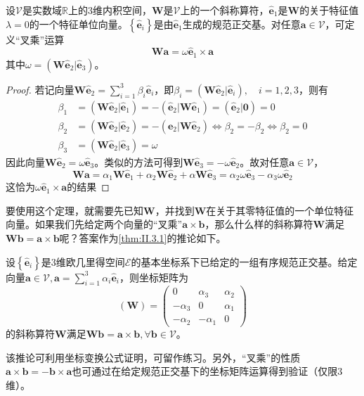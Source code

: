 \documentclass[main.tex]{subfiles}
\begin{document}
\begin{theorem}\label{thm:II.3.1}
    设$\mathcal{V}$是实数域$\mathbb{R}$上的3维内积空间，$\mathbf{W}$是$\mathcal{V}$上的一个斜称算符，$\mathbf{\hat{e}}_1$是$\mathbf{W}$的关于特征值$\lambda=0$的一个特征单位向量。$\left\{\mathbf{\hat{e}}_i\right\}$是由$\mathbf{\hat{e}}_1$生成的规范正交基。对任意$\mathbf{a}\in\mathcal{V}$，可定义“叉乘”运算
    \[\mathbf{Wa}=\omega\mathbf{\hat{e}}_1\times\mathbf{a}\]
    其中$\omega=\left(\mathbf{W\hat{e}}_2|\mathbf{\hat{e}}_3\right)$。
\end{theorem}
\begin{proof}
    若记向量$\mathbf{W\hat{e}}_2=\sum_{i=1}^3\beta_i\mathbf{\hat{e}}_i$，即$\beta_i=\left(\mathbf{W\hat{e}}_2|\mathbf{\hat{e}}_i\right),\quad i=1,2,3$，则有
    \begin{align*}
        \beta_1 & =\left(\mathbf{W\hat{e}}_2|\mathbf{\hat{e}}_1\right)=-\left(\mathbf{\hat{e}}_2|\mathbf{W\hat{e}}_1\right)=\left(\mathbf{\hat{e}}_2|\mathbf{0}\right)=0     \\
        \beta_2 & =\left(\mathbf{W\hat{e}}_2|\mathbf{\hat{e}}_2\right)=-\left(\mathbf{e}_2|\mathbf{W\hat{e}}_2\right)\Leftrightarrow\beta_2=-\beta_2\Leftrightarrow\beta_2=0 \\
        \beta_3 & =\left(\mathbf{W\hat{e}}_2|\mathbf{\hat{e}}_3\right)=\omega
    \end{align*}
    因此向量$\mathbf{W\hat{e}}_2=\omega\mathbf{\hat{e}}_3$。类似的方法可得到$\mathbf{W\hat{e}}_3=-\omega\mathbf{\hat{e}}_2$。故对任意$\mathbf{a}\in\mathcal{V}$，
    \[
        \mathbf{Wa}=\alpha_1\mathbf{W\hat{e}}_1+\alpha_2\mathbf{W\hat{e}}_2+\alpha\mathbf{W\hat{e}}_3=\alpha_2\omega\mathbf{\hat{e}}_3-\alpha_3\omega\mathbf{\hat{e}}_2
    \]
    这恰为$\omega\mathbf{\hat{e}}_1\times\mathbf{a}$的结果
\end{proof}
要使用这个定理，就需要先已知$\mathbf{W}$，并找到$\mathbf{W}$在关于其零特征值的一个单位特征向量。如果我们先给定两个向量的“叉乘”$\mathbf{a}\times\mathbf{b}$，那么什么样的斜称算符$\mathbf{W}$满足$\mathbf{Wb}=\mathbf{a}\times\mathbf{b}$呢？答案作为\ref{thm:II.3.1}的推论如下。

\begin{corollary}
    设$\left\{\mathbf{\hat{e}}_i\right\}$是3维欧几里得空间$\mathcal{E}$的基本坐标系下已给定的一组有序规范正交基。给定向量$\mathbf{a}\in\mathcal{V},\mathbf{a}=\sum_{i=1}^3\alpha_i\mathbf{\hat{e}}_i$，则坐标矩阵为
    \[\left(\mathbf{W}\right)=\left(\begin{array}{ccc}0&\alpha_3&\alpha_2\\-\alpha_3&0&\alpha_1\\-\alpha_2&-\alpha_1&0\end{array}\right)\]
    的斜称算符$\mathbf{W}$满足$\mathbf{Wb}=\mathbf{a}\times\mathbf{b},\forall\mathbf{b}\in\mathcal{V}$。
\end{corollary}
该推论可利用坐标变换公式证明，可留作练习。另外，“叉乘”的性质$\mathbf{a}\times\mathbf{b}=-\mathbf{b}\times\mathbf{a}$也可通过在给定规范正交基下的坐标矩阵运算得到验证（仅限3维）。
\end{document}

